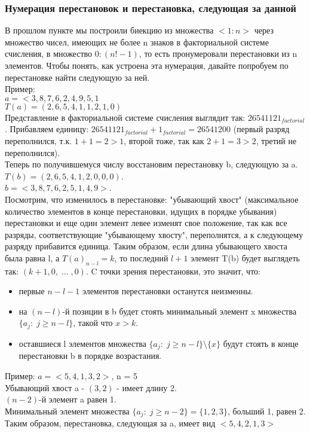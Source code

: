 \subsubsection{Нумерация перестановок и перестановка, следующая за данной}
В прошлом пункте мы построили биекцию из множества $<1:n>$ через множество чисел, имеющих не более n знаков в факториальной системе счисления, в множество $0:(n! - 1)$, то есть пронумеровали перестановки из n элементов. Чтобы понять, как устроена эта нумерация, давайте попробуем по перестановке найти следующую за ней.\\
Пример:\\
$a = <3, 8, 7, 6, 2, 4, 9, 5, 1$\\
$T(a) = (2, 6, 5, 4, 1, 1, 2, 1, 0)$\\
Представление в факториальной системе счисления выглядит так: $26541121_{factorial}$. Прибавляем единицу: $26541121_{factorial} + 1_{factorial} = 26541200$ (первый разряд переполнился, т.к. $1 + 1 = 2 > 1$, второй тоже, так как $2 + 1 = 3 > 2$, третий не переполнился).\\
Теперь по получившемуся числу восстановим перестановку b, следующую за a.\\
$T(b) = (2, 6, 5, 4, 1, 2, 0, 0, 0)$.\\
$b = <3, 8, 7, 6, 2, 5, 1, 4, 9>$.\\
Посмотрим, что изменилось в перестановке: "убывающий хвост" (максимальное количество элементов в конце перестановки, идущих в порядке убывания) перестановки и еще один элемент левее изменят свое положение, так как все разряды, соответствующие "убывающему хвосту", переполнятся, а к следующему разряду прибавится единица. Таким образом, если длина убывающего хвоста была равна l, а $T(a)_{n - l} = k$, то последний $l + 1$ элемент T(b) будет выглядеть так: $(k + 1, 0, \; ... \; , 0)$. C точки зрения перестановки, это значит, что:\\
\begin{itemize}
\item первые $n - l - 1$ элементов перестановки останутся неизменны.\\
\item на $(n - l)$-й позиции в b будет стоять минимальный элемент x множества $\{a_j : \; j \geq n - l\}$, такой что $x > k$.\\
\item оставшиеся l элементов множества $\{a_j : \; j \geq n - l\} \setminus \{x\}$ будут стоять в конце перестановки b в порядке возрастания.\\
\end{itemize}
Пример:
$a = <5, 4, 1, 3, 2>$, n = 5\\
Убывающий хвост a - $(3, 2)$ - имеет длину 2.\\
$(n - 2)$-й элемент a равен 1.\\
Минимальный элемент множества $\{a_j : \; j \geq n - 2\} = \{1, 2, 3\}$, больший 1, равен 2.\\
Таким образом, перестановка, следующая за a, имеет вид $<5, 4, 2, 1, 3>$

